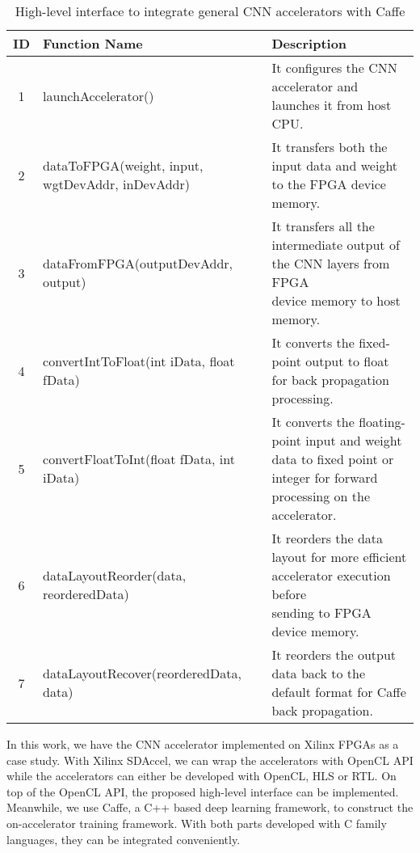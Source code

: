 \begin{table*}
        \centering
        \vspace{-0.3em}
        \caption{High-level interface to integrate general CNN accelerators with Caffe}
        \label{tab:api}
        \vspace{-0.3em}
        \begin{tabular}{c|l|l}
                \toprule
                ID & Function Name & Description  \\
                \midrule
                1 & launchAccelerator() & It configures the CNN accelerator and launches it from host CPU. \\
		\midrule
                2 & dataToFPGA(weight, input, wgtDevAddr, inDevAddr) & It transfers both the input data and weight to the FPGA device memory. \\
		\midrule
		3 & dataFromFPGA(outputDevAddr, output) & \shortstack[l]{It transfers all the intermediate output of the CNN layers from FPGA \\device memory to host memory.} \\
		\midrule
		4 & convertIntToFloat(int iData, float fData) & It converts the fixed-point output to float for back propagation processing. \\
		\midrule
		5 & convertFloatToInt(float fData,  int iData) & \shortstack[l]{It converts the floating-point input and weight data to fixed point or \\integer for forward processing on the accelerator.} \\
		\midrule
		6 & dataLayoutReorder(data, reorderedData) & \shortstack[l]{It reorders the data layout for more efficient accelerator execution before \\sending to FPGA device memory.} \\
		\midrule
		7 & dataLayoutRecover(reorderedData, data) & It reorders the output data back to the default format for Caffe back propagation. \\
                \bottomrule
        \end{tabular}
        \vspace{-1em}
\end{table*}

In this work, we have the CNN accelerator implemented on Xilinx FPGAs as a case study. 
With Xilinx SDAccel, we can wrap the accelerators with OpenCL API while the accelerators 
can either be developed with OpenCL, HLS or RTL. On top of the OpenCL API, the proposed 
high-level interface can be implemented. Meanwhile, we use Caffe, a C++ based 
deep learning framework, to construct the on-accelerator training framework. With 
both parts developed with C family languages, they can be integrated conveniently. 


